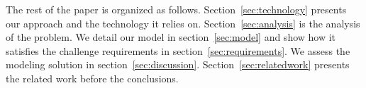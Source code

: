 

The rest of the paper is organized as follows. Section~\ref{sec:technology} presents our approach and the technology it relies on. Section~\ref{sec:analysis} is the analysis of the problem. We detail our model in section~\ref{sec:model} and show how it satisfies the challenge requirements in section~\ref{sec:requirements}. We assess the modeling solution in section~\ref{sec:discussion}. Section~\ref{sec:relatedwork} presents the related work before the conclusions.%





